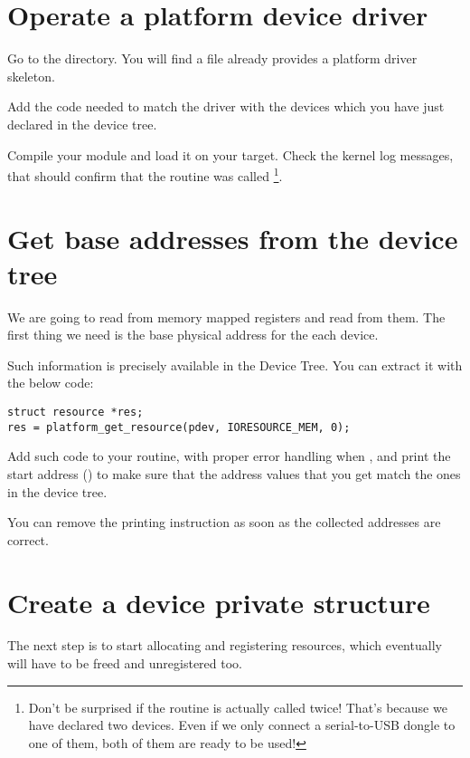 \section{Operate a platform device driver}

Go to the  directory.
You will find a  file already provides a platform
driver skeleton.

Add the code needed to match the driver with the devices which you have
just declared in the device tree.

Compile your module and load it on your target. Check the kernel log
messages, that should confirm that the  routine was
called \footnote{Don't be surprised if the  routine is
actually called twice! That's because we have declared two devices.
Even if we only connect a serial-to-USB dongle to one of them, both
of them are ready to be used!}.

\section{Get base addresses from the device tree}

We are going to read from memory mapped registers and read from them.
The first thing we need is the base physical address for the each
device.

Such information is precisely available in the Device Tree. You can
extract it with the below code:

\begin{verbatim}
struct resource *res;
res = platform_get_resource(pdev, IORESOURCE_MEM, 0);
\end{verbatim}

Add such code to your  routine, with proper error
handling when , and print the start address
() to make sure that the address values that
you get match the ones in the device tree. 

You can remove the printing instruction as soon as the collected
addresses are correct.

\section{Create a device private structure}

The next step is to start allocating and registering resources,
which eventually will have to be freed and unregistered too.

